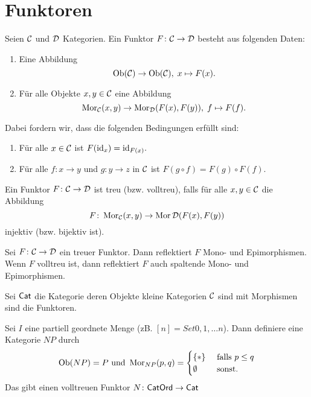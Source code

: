 \section{Funktoren}
\begin{Def}[Funktor]
    Seien \(\mathcal{C}\) und \(\mathcal{D}\) Kategorien. Ein Funktor \(F\colon\mathcal{C}\to\mathcal{D}\) besteht aus folgenden Daten:
    \begin{enumerate}
        \item Eine Abbildung \[\operatorname{Ob}(\mathcal{C})\to\operatorname{Ob}(\mathcal{C}),\; x\mapsto F(x).\]
        \item Für alle Objekte \(x,y\in\mathcal{C}\) eine Abbildung 
        \[\operatorname{Mor}_{\mathcal{C}}(x,y)\to\operatorname{Mor}_{\mathcal{D}}(F(x),F(y)),\; f\mapsto F(f).\]
    \end{enumerate} Dabei fordern wir, dass die folgenden Bedingungen erfüllt sind:
    \begin{enumerate}
        \item Für alle \(x\in\mathcal{C}\) ist \(F(\mathrm{id}_x)=\mathrm{id}_{F(x)}.\)
        \item Für alle \(f\colon x\to y\) und \(g\colon y\to z\) in \(\mathcal{C}\) ist \(F(g\circ f)=F(g)\circ F(f).\)
    \end{enumerate}
    Ein Funktor \(F\colon\mathcal{C}\to\mathcal{D}\) ist treu (bzw. volltreu), falls für alle \(x,y\in \mathcal{C}\) die Abbildung \[F\colon\operatorname{Mor}_{\mathcal{C}}(x,y)\to\operatorname{Mor}\mathcal{D}(F(x),F(y))\]  injektiv (bzw. bijektiv ist).
\end{Def}
\begin{Bem}
    Sei \(F\colon\mathcal{C}\to \mathcal{D}\) ein treuer Funktor. Dann reflektiert \(F\) Mono- und Epimorphismen. Wenn \(F\) volltreu ist, dann reflektiert \(F\) auch spaltende Mono- und Epimorphismen.
\end{Bem}
\begin{Def}
    Sei \(\mathsf{Cat}\) die Kategorie deren Objekte kleine Kategorien \(\mathcal{C}\) sind mit Morphismen sind die Funktoren.
\end{Def}
\begin{Def}
    Sei \(I\) eine partiell geordnete Menge (zB. \([n]=Set{0,1,\dots n}\)). Dann definiere eine Kategorie \(N P\) durch $$\operatorname{Ob}(N P)=P\text{ und } \operatorname{Mor}_{N P}(p,q)=\begin{cases}
        \{*\} & \text{ falls } p\leq q\\
        \emptyset & \text{ sonst.}
    \end{cases}$$
    Das gibt einen volltreuen Funktor \(N\colon \mathsf{CatOrd}\to\mathsf{Cat}\) 
\end{Def}
